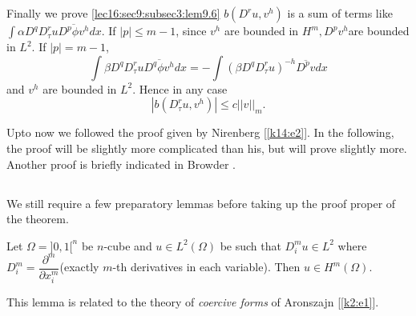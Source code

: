 Finally we prove \ref{lec16:sec9:subsec3:lem9.6} $b(D^r u, v^h)$ is a sum of terms like $ \int
\alpha D^q D^r_{\tau} u \overline{D^p \phi v^h} dx$. If $|p| \leq
m- 1$, since $v^h$ are bounded in $H^m, D^p v^h$\pageoriginale are bounded in
$L^2$. If $|p| = m-1$,  
$$
\int \beta D^q D^{r}_{\tau} u \overline{ D^q \phi v^h}dx = - \int (
\beta D^q D^r_{\tau} u )^{-h} \overline{D^p v} dx 
$$
and $v^h$ are bounded in $L^2$. Hence in any case 
$$
|b(D^r_{\tau} u, v^h)| \leq c||v||_m. 
$$

Upto now we followed the proof given by Nirenberg [\ref{k14:e2}]. In the
following, the proof will be slightly more complicated than his, but
will prove slightly more. Another proof is briefly indicated in
Browder \cite{k5}.  

\subsection{}\label{lec16:sec9:subsec4} 

We still require a few preparatory lemmas
before taking up the proof proper of the theorem.  

\begin{lemma}\label{lec16:sec9:subsec4:lem9.7} %
  Let $\Omega = ] 0, 1[^n$ be $n$-cube and $u \in L^2 (\Omega)$
      be such that $D^m_i u \in L^2$ where $D^m_i =
      \dfrac{\partial^m}{\partial x^m_i}$(exactly $m$-th derivatives in
      each variable). Then $u \in H^m(\Omega)$.  
\end{lemma}

\begin{remark*}%
This lemma is related to the theory of \textit{ coercive forms } of
Aronszajn [\ref{k2:e1}].  
\end{remark*}

